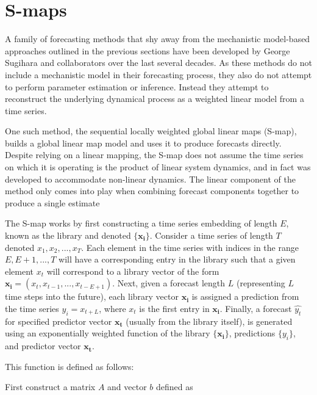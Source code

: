 

\section{S-maps}

    A family of forecasting methods that shy away from the mechanistic model-based approaches outlined in the previous sections have been developed by George Sugihara and collaborators \cite{Sugihara1990}\cite{Sugihara1994}\cite{Hsieh2008}\cite{Glaser2014} over the last several decades. As these methods do not include a mechanistic model in their forecasting process, they also do not attempt to perform parameter estimation or inference. Instead they attempt to reconstruct the underlying dynamical process as a weighted linear model from a time series.

    One such method, the sequential locally weighted global linear maps (S-map), builds a global linear map model and uses it to produce forecasts directly. Despite relying on a linear mapping, the S-map does not assume the time series on which it is operating is the product of linear system dynamics, and in fact was developed to accommodate non-linear dynamics. The linear component of the method only comes into play when combining forecast components together to produce a single estimate

    The S-map works by first constructing a time series embedding of length $E$, known as the library and denoted $\{\mathbf{x_i}\}$. Consider a time series of length $T$ denoted $x_1, x_2,..., x_T$. Each element in the time series with indices in the range $E,E+1,...,T$ will have a corresponding entry in the library such that a given element $x_t$ will correspond to a library vector of the form $\mathbf{x_i} = (x_t, x_{t-1},...,x_{t-E+1})$. Next, given a forecast length $L$ (representing $L$ time steps into the future), each library vector $\mathbf{x_i}$ is assigned a prediction from the time series $y_i = x_{t+L}$, where $x_t$ is the first entry in $\mathbf{x_i}$. Finally, a forecast ${\hat{y_t}}$ for specified predictor vector $\mathbf{x_t}$ (usually from the library itself), is generated using an exponentially weighted function of the library $\{\mathbf{x_i}\}$, predictions $\{y_i\}$, and predictor vector $\mathbf{x_t}$.

    This function is defined as follows:

    First construct a matrix $A$ and vector $b$ defined as

